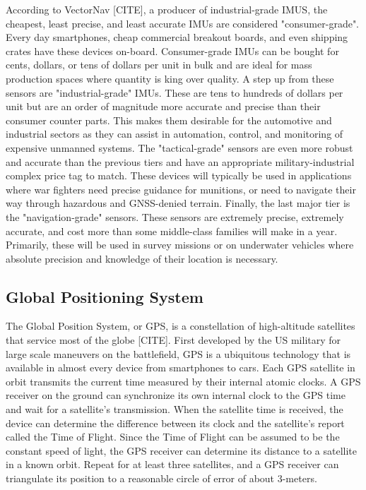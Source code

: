 According to VectorNav [CITE], a producer of industrial-grade IMUS, the cheapest, least precise, and least accurate IMUs are considered "consumer-grade".
Every day smartphones, cheap commercial breakout boards, and even shipping crates have these devices on-board.
Consumer-grade IMUs can be bought for cents, dollars, or tens of dollars per unit in bulk and are ideal for mass production spaces where quantity is king over quality.
A step up from these sensors are "industrial-grade" IMUs. 
These are tens to hundreds of dollars per unit but are an order of magnitude more accurate and precise than their consumer counter parts.
This makes them desirable for the automotive and industrial sectors as they can assist in automation, control, and monitoring of expensive unmanned systems.
The "tactical-grade" sensors are even more robust and accurate than the previous tiers and have an appropriate military-industrial complex price tag to match. 
These devices will typically be used in applications where war fighters need precise guidance for munitions, or need to navigate their way through hazardous and GNSS-denied terrain.
Finally, the last major tier is the "navigation-grade" sensors. 
These sensors are extremely precise, extremely accurate, and cost more than some middle-class families will make in a year.
Primarily, these will be used in survey missions or on underwater vehicles where absolute precision and knowledge of their location is necessary.

\subsection{Global Positioning System} \label{ssec:gps}
The Global Position System, or GPS, is a constellation of high-altitude satellites that service most of the globe [CITE].
First developed by the US military for large scale maneuvers on the battlefield, GPS is a ubiquitous technology that is available in almost every device from smartphones to cars.
Each GPS satellite in orbit transmits the current time measured by their internal atomic clocks.
A GPS receiver on the ground can synchronize its own internal clock to the GPS time and wait for a satellite's transmission.
When the satellite time is received, the device can determine the difference between its clock and the satellite's report called the Time of Flight.
Since the Time of Flight can be assumed to be the constant speed of light, the GPS receiver can determine its distance to a satellite in a known orbit.
Repeat for at least three satellites, and a GPS receiver can triangulate its position to a reasonable circle of error of about 3-meters.

